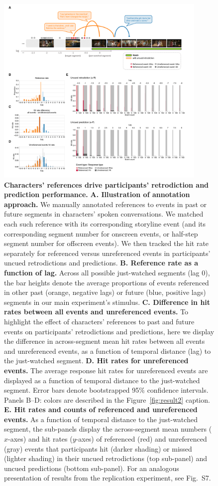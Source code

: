 \documentclass[10pt]{article}
\newcommand{\characterRefs}{S7}
\begin{document}
\begin{figure}[tp]
  \centering
  \includegraphics[width=0.9\textwidth]{results3}
  \caption{\textbf{Characters' references drive participants' retrodiction and prediction performance.}  \textbf{A. Illustration of annotation approach.}  We manually annotated references to events in past or future segments in characters' spoken conversations.  We matched each such reference with its corresponding storyline event (and its corresponding segment number for onscreen events, or half-step segment number for offscreen events).  We then tracked the hit rate separately for referenced versus unreferenced events in participants' uncued retrodictions and predictions.  \textbf{B. Reference rate as a function of lag.}  Across all possible just-watched segments (lag 0), the bar heights denote the average proportions of events referenced in other past (orange, negative lags) or future (blue, positive lags) segments in our main experiment's stimulus.  \textbf{C. Difference in hit rates between all events and unreferenced events.}  To highlight the effect of characters' references to past and future events on participants' retrodictions and predictions, here we display the difference in across-segment mean hit rates between all events and unreferenced events, as a function of temporal distance (lag) to the just-watched segment.  \textbf{D. Hit rates for unreferenced events.}  The average response hit rates for unreferenced events are displayed as a function of temporal distance to the just-watched segment.  Error bars denote bootstrapped 95\% confidence intervals.  Panels B--D: colors are described in the Figure~\ref{fig:result2} caption.  \textbf{E.  Hit rates and counts of referenced and unreferenced events.}  As a function of temporal distance to the just-watched segment, the sub-panels display the across-segment mean numbers ($x$-axes) and hit rates ($y$-axes) of referenced (red) and unreferenced (gray) events that participants hit (darker shading) or missed (lighter shading) in their uncued retrodictions (top sub-panel) and uncued predictions (bottom sub-panel).  For an analogous presentation of results from the replication experiment, see Fig.~\characterRefs.}
  \label{fig:result3}
\end{figure}
\end{document}

